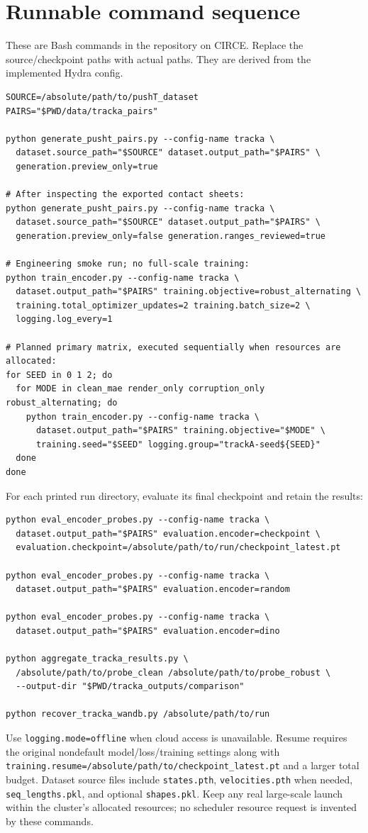 \documentclass[11pt,a4paper]{article}
\newcommand{\code}[1]{\nolinkurl{#1}}
\begin{document}
\section{Runnable command sequence}
These are Bash commands in the repository on CIRCE. Replace the source/checkpoint
paths with actual paths. They are derived from the implemented Hydra config.
\begin{lstlisting}
SOURCE=/absolute/path/to/pushT_dataset
PAIRS="$PWD/data/tracka_pairs"

python generate_pusht_pairs.py --config-name tracka \
  dataset.source_path="$SOURCE" dataset.output_path="$PAIRS" \
  generation.preview_only=true

# After inspecting the exported contact sheets:
python generate_pusht_pairs.py --config-name tracka \
  dataset.source_path="$SOURCE" dataset.output_path="$PAIRS" \
  generation.preview_only=false generation.ranges_reviewed=true

# Engineering smoke run; no full-scale training:
python train_encoder.py --config-name tracka \
  dataset.output_path="$PAIRS" training.objective=robust_alternating \
  training.total_optimizer_updates=2 training.batch_size=2 \
  logging.log_every=1

# Planned primary matrix, executed sequentially when resources are allocated:
for SEED in 0 1 2; do
  for MODE in clean_mae render_only corruption_only robust_alternating; do
    python train_encoder.py --config-name tracka \
      dataset.output_path="$PAIRS" training.objective="$MODE" \
      training.seed="$SEED" logging.group="trackA-seed${SEED}"
  done
done
\end{lstlisting}
For each printed run directory, evaluate its final checkpoint and retain the results:
\begin{lstlisting}
python eval_encoder_probes.py --config-name tracka \
  dataset.output_path="$PAIRS" evaluation.encoder=checkpoint \
  evaluation.checkpoint=/absolute/path/to/run/checkpoint_latest.pt

python eval_encoder_probes.py --config-name tracka \
  dataset.output_path="$PAIRS" evaluation.encoder=random

python eval_encoder_probes.py --config-name tracka \
  dataset.output_path="$PAIRS" evaluation.encoder=dino

python aggregate_tracka_results.py \
  /absolute/path/to/probe_clean /absolute/path/to/probe_robust \
  --output-dir "$PWD/tracka_outputs/comparison"

python recover_tracka_wandb.py /absolute/path/to/run
\end{lstlisting}
Use \code{logging.mode=offline} when cloud access is unavailable. Resume requires
the original nondefault model/loss/training settings along with
\code{training.resume=/absolute/path/to/checkpoint_latest.pt} and a larger total budget.
Dataset source files include \code{states.pth}, \code{velocities.pth} when needed,
\code{seq_lengths.pkl}, and optional \code{shapes.pkl}. Keep any real large-scale
launch within the cluster's allocated resources; no scheduler resource request is
invented by these commands.
\end{document}
